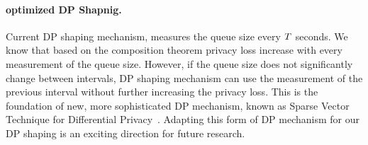 \paragraph{optimized DP Shapnig.}
Current DP shaping mechanism, measures the queue size every $T$ seconds.
We know that based on the composition theorem privacy loss increase with every measurement of the queue size. 
However, if the queue size does not significantly change between intervals, DP shaping mechanism can use the measurement of the previous interval without further increasing the privacy loss. 
This is the foundation of new, more sophisticated DP mechanism, known as Sparse Vector Technique for Differential Privacy~\cite{lyu2016understanding}. 
Adapting this form of DP mechanism for our DP shaping is an exciting direction for future research.
